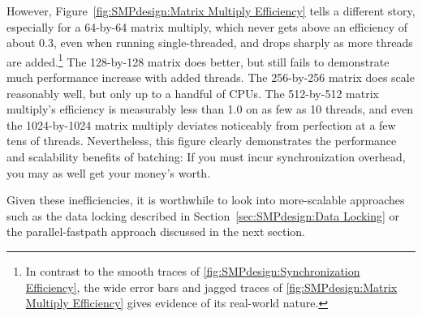 However,
Figure~\ref{fig:SMPdesign:Matrix Multiply Efficiency}
tells a different story, especially for a 64-by-64 matrix multiply,
which never gets above an efficiency of about 0.3, even when running
single-threaded, and drops sharply as more threads are added.\footnote{
	In contrast to the smooth traces of
	\cref{fig:SMPdesign:Synchronization Efficiency},
	the wide error bars and jagged traces of
	\cref{fig:SMPdesign:Matrix Multiply Efficiency}
	gives evidence of its real-world nature.}
The 128-by-128 matrix does better, but still fails to demonstrate
much performance increase with added threads.
The 256-by-256 matrix does scale reasonably well, but only up to a handful
of CPUs.
The 512-by-512 matrix multiply's efficiency is measurably less
than 1.0 on as few as 10 threads, and even the 1024-by-1024 matrix
multiply deviates noticeably from perfection at a few tens of threads.
Nevertheless, this figure clearly demonstrates the performance and
scalability benefits of batching: If you must incur synchronization
overhead, you may as well get your money's worth.

\QuickQuizEnd

Given these inefficiencies,
it is worthwhile to look into more-scalable approaches
such as the data locking described in
Section~\ref{sec:SMPdesign:Data Locking}
or the parallel-fastpath approach discussed in the next section.

